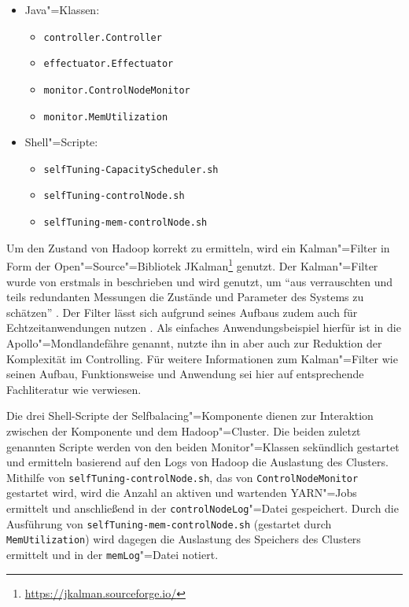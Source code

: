 \begin{itemize}
    \item Java"=Klassen:
    \begin{itemize}
        \item \texttt{controller.Controller}
        \item \texttt{effectuator.Effectuator}
        \item \texttt{monitor.ControlNodeMonitor}
        \item \texttt{monitor.MemUtilization}
    \end{itemize}
    \item Shell"=Scripte:
    \begin{itemize}
        \item \texttt{selfTuning-CapacityScheduler.sh}
        \item \texttt{selfTuning-controlNode.sh}
        \item \texttt{selfTuning-mem-controlNode.sh}
    \end{itemize}
\end{itemize}

Um den Zustand von Hadoop korrekt zu ermitteln, wird ein Kalman"=Filter in Form der Open"=Source"=Bibliotek JKalman\footnote{\url{https://jkalman.sourceforge.io/}} genutzt.
Der Kalman"=Filter wurde von \citeauthor{Kalman1960} erstmals in \cite{Kalman1960} beschrieben und wird genutzt, um \enquote{aus verrauschten und teils redundanten Messungen die Zustände und Parameter des Systems zu schätzen} \cite{Marchthaler2017}.
Der Filter lässt sich aufgrund seines Aufbaus zudem auch für Echtzeitanwendungen nutzen \cite{Marchthaler2017}.
Als einfaches Anwendungsbeispiel hierfür ist in \cite{Marchthaler2017} die Apollo"=Mondlandefähre genannt, \citeauthor{Strukov2001} nutzte ihn in \cite{Strukov2001} aber auch zur Reduktion der Komplexität im Controlling.
Für weitere Informationen zum Kalman"=Filter wie seinen Aufbau, Funktionsweise und Anwendung sei hier auf entsprechende Fachliteratur wie \zB \cite{Kim2016,Simon2006,Aggoun2004} verwiesen.

Die drei Shell-Scripte der Selfbalacing"=Komponente dienen zur Interaktion zwischen der Komponente und dem Hadoop"=Cluster.
Die beiden zuletzt genannten Scripte werden von den beiden Monitor"=Klassen sekündlich gestartet und ermitteln basierend auf den Logs von Hadoop die Auslastung des Clusters.
Mithilfe von \texttt{selfTuning-controlNode.sh}, das von \texttt{ControlNodeMonitor} gestartet wird, wird die Anzahl an aktiven und wartenden \ac{YARN}"=Jobs ermittelt und anschließend in der \texttt{controlNodeLog}"=Datei gespeichert.
Durch die Ausführung von \texttt{selfTuning-mem-controlNode.sh} (gestartet durch \texttt{MemUtilization}) wird dagegen die Auslastung des Speichers des Clusters ermittelt und in der \texttt{memLog}"=Datei notiert.

